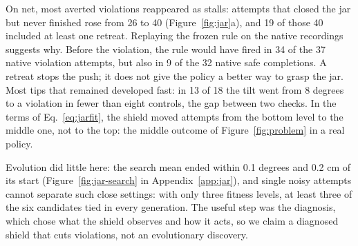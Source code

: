 On net, most averted violations reappeared as stalls: attempts that closed the jar but never
finished rose from 26 to 40 (Figure~\ref{fig:jar}a), and 19 of those 40
included at least one retreat. Replaying the frozen rule on the native recordings suggests why. Before the violation, the rule would have fired in 34
of the 37 native violation attempts, but also in 9 of the 32 native safe
completions. A retreat stops the push; it does not give the policy a better
way to grasp the jar. Most tips that remained developed fast: in 13 of 18
the tilt went from 8 degrees to a violation in fewer than eight controls,
the gap between two checks. In the terms of Eq.~\ref{eq:jarfit}, the shield
moved attempts from the bottom level to the middle one, not to the top: the
middle outcome of Figure~\ref{fig:problem} in a real policy.

Evolution did little here: the search mean ended within 0.1 degrees and
0.2 cm of its start (Figure~\ref{fig:jar-search} in Appendix~\ref{app:jar}),
and single noisy attempts cannot separate such close settings: with only
three fitness levels, at least three of the six candidates tied in every
generation. The useful step
was the diagnosis, which chose what the shield observes and how it acts, so
we claim a diagnosed shield that cuts violations, not an evolutionary
discovery.

